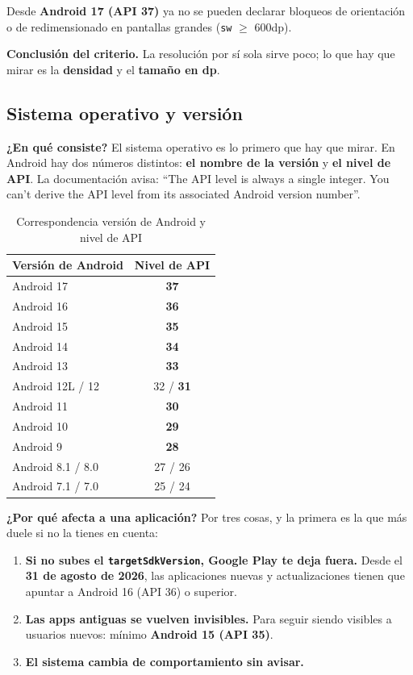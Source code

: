 \documentclass[11pt,a4paper]{article}
\newcommand{\code}[1]{\texttt{\color{navylight}#1}}
\newcommand{\campo}[1]{\textbf{\color{navy}#1}}
\begin{document}
	Desde \textbf{Android 17 (API 37)} ya no se pueden declarar bloqueos de orientación o de redimensionado en pantallas grandes (\code{sw} $\geq$ 600dp).
	
	\campo{Conclusión del criterio.} La resolución por sí sola sirve poco; lo que hay que mirar es la \textbf{densidad} y el \textbf{tamaño en dp}.
	
	\subsection{Sistema operativo y versión}
	
	\campo{¿En qué consiste?}
	El sistema operativo es lo primero que hay que mirar. En Android hay dos números distintos: \textbf{el nombre de la versión} y \textbf{el nivel de API}. La documentación avisa: \enquote{The API level is always a single integer. You can't derive the API level from its associated Android version number}.
	
	\begin{table}[htbp]
		\centering
		\small
		\begin{tabular}{@{}l c@{}}
			\toprule
			\rowcolor{primary}
			\textcolor{paper}{\sffamily\bfseries Versión de Android} & \textcolor{paper}{\sffamily\bfseries Nivel de API} \\
			\midrule
			Android 17 & \textbf{37} \\
			\rowcolor{soft}
			Android 16 & \textbf{36} \\
			Android 15 & \textbf{35} \\
			\rowcolor{soft}
			Android 14 & \textbf{34} \\
			Android 13 & \textbf{33} \\
			\rowcolor{soft}
			Android 12L / 12 & 32 / \textbf{31} \\
			Android 11 & \textbf{30} \\
			\rowcolor{soft}
			Android 10 & \textbf{29} \\
			Android 9 & \textbf{28} \\
			\rowcolor{soft}
			Android 8.1 / 8.0 & 27 / 26 \\
			Android 7.1 / 7.0 & 25 / 24 \\
			\bottomrule
		\end{tabular}
		\caption{Correspondencia versión de Android y nivel de API}
	\end{table}
	
	\campo{¿Por qué afecta a una aplicación?}
	Por tres cosas, y la primera es la que más duele si no la tienes en cuenta:
	\begin{enumerate}[leftmargin=*,itemsep=0.15em]
		\item \textbf{Si no subes el \code{targetSdkVersion}, Google Play te deja fuera.} Desde el \textbf{31 de agosto de 2026}, las aplicaciones nuevas y actualizaciones tienen que apuntar a Android 16 (API 36) o superior.
		\item \textbf{Las apps antiguas se vuelven invisibles.} Para seguir siendo visibles a usuarios nuevos: mínimo \textbf{Android 15 (API 35)}.
		\item \textbf{El sistema cambia de comportamiento sin avisar.}
	\end{enumerate}
	
\end{document}
